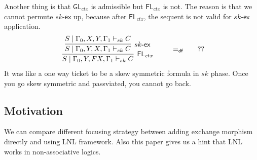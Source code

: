 \documentclass{article}
\newcommand{\fl}{\mathsf{FL}}
\newcommand{\gl}{\mathsf{GL}}
\newcommand{\td}{\text{-}}
\newcommand{\ex}{\mathsf{ex}}
\begin{document}
Another thing is that $\gl_{ctx}$ is admissible but $\fl_{ctx}$ is not.
The reason is that we cannot permute $sk\td\ex$ up, because after $\fl_{ctx}$, the sequent is not valid for $sk\td\ex$ application.
\begin{displaymath}
  \begin{array}{cc}
    \infer[\fl_{ctx}]{S \mid \Gamma_{0} , Y , FX , \Gamma_{1} \vdash_{sk} C}{
      \infer[sk\td\ex]{S \mid \Gamma_{0} , Y , X , \Gamma_{1} \vdash_{sk} C}{S \mid \Gamma_{0} , X , Y , \Gamma_{1} \vdash_{sk} C}
    }
  \end{array}
  \qquad
  =_{\mathsf{df}}
  \qquad
  ??
\end{displaymath}
It was like a one way ticket to be a skew symmetric formula in $sk$ phase. Once you go skew symmetric and passviated, you cannot go back.
\subsection*{Motivation}
We can compare different focusing strategy between adding exchange morphism directly and using LNL framework.
Also this paper gives us a hint that LNL works in non-associative logics.
\end{document}
